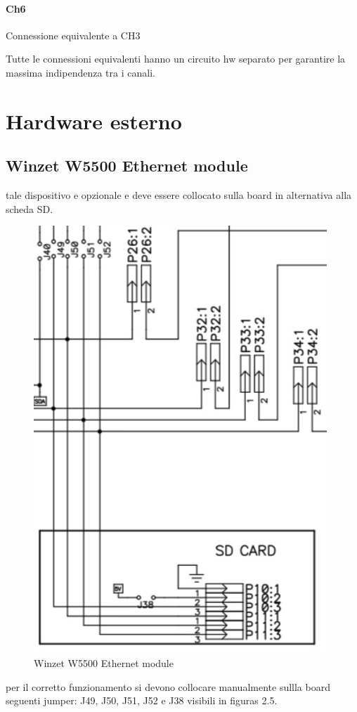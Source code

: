 \documentclass[12pt,a4paper]{report}
\begin{document}
\paragraph{Ch6}
Connessione equivalente a CH3

Tutte le connessioni equivalenti hanno un circuito hw separato per garantire la massima indipendenza tra i canali.
\section{ Hardware esterno }

\subsection{Winzet W5500 Ethernet module}
tale dispositivo e opzionale e deve essere collocato sulla board in alternativa alla scheda SD.

\begin{figure}[H]
    \centering
    \includegraphics[width=0.7\linewidth]{../image/SD_and_W5500.png}
    \caption{Winzet W5500 Ethernet module}
\end{figure}

per il corretto funzionamento si devono collocare manualmente sullla board seguenti jumper: J49, J50, J51, J52 e J38 visibili in figuras 2.5.
\end{document}

